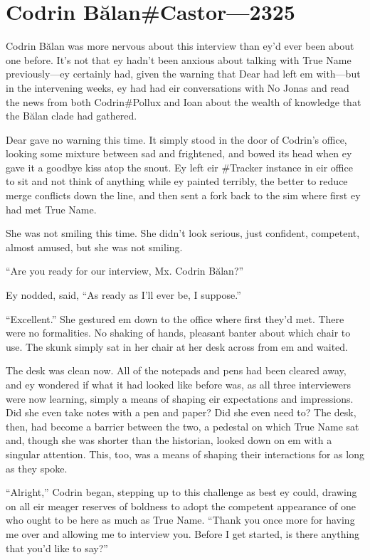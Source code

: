 \hypertarget{codrin-bux103lancastor-2325}{%
\chapter{Codrin Bălan\#Castor—2325}\label{codrin-bux103lancastor-2325}}

Codrin Bălan was more nervous about this interview than ey'd ever been about one before. It's not that ey hadn't been anxious about talking with True Name previously---ey certainly had, given the warning that Dear had left em with---but in the intervening weeks, ey had had eir conversations with No Jonas and read the news from both Codrin\#Pollux and Ioan about the wealth of knowledge that the Bălan clade had gathered.

Dear gave no warning this time. It simply stood in the door of Codrin's office, looking some mixture between sad and frightened, and bowed its head when ey gave it a goodbye kiss atop the snout. Ey left eir \#Tracker instance in eir office to sit and not think of anything while ey painted terribly, the better to reduce merge conflicts down the line, and then sent a fork back to the sim where first ey had met True Name.

She was not smiling this time. She didn't look serious, just confident, competent, almost amused, but she was not smiling.

``Are you ready for our interview, Mx. Codrin Bălan?''

Ey nodded, said, ``As ready as I'll ever be, I suppose.''

``Excellent.'' She gestured em down to the office where first they'd met. There were no formalities. No shaking of hands, pleasant banter about which chair to use. The skunk simply sat in her chair at her desk across from em and waited.

The desk was clean now. All of the notepads and pens had been cleared away, and ey wondered if what it had looked like before was, as all three interviewers were now learning, simply a means of shaping eir expectations and impressions. Did she even take notes with a pen and paper? Did she even need to? The desk, then, had become a barrier between the two, a pedestal on which True Name sat and, though she was shorter than the historian, looked down on em with a singular attention. This, too, was a means of shaping their interactions for as long as they spoke.

``Alright,'' Codrin began, stepping up to this challenge as best ey could, drawing on all eir meager reserves of boldness to adopt the competent appearance of one who ought to be here as much as True Name. ``Thank you once more for having me over and allowing me to interview you. Before I get started, is there anything that you'd like to say?''

